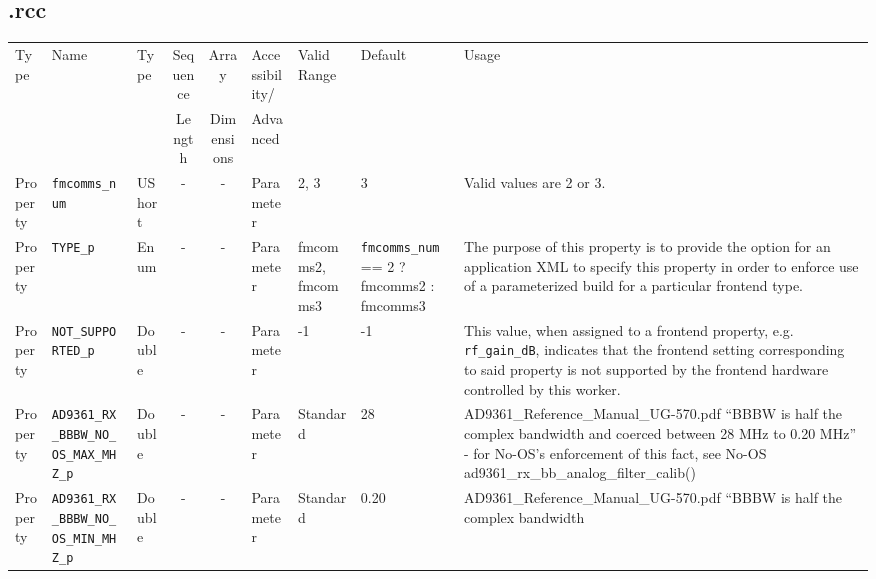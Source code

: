 \begin{landscape}
	\subsection*{\comp.rcc}
	\begin{scriptsize}
		\begin{longtable}{|p{1.8cm}|p{4.1cm}|p{1cm}|c|c|p{1.6cm}|p{3.7cm}|p{3.7cm}|p{2.5cm}|}
			\hline
			\rowcolor{blue}
			Type         & Name                                & Type & Sequence & Array      & Accessibility/ & Valid Range  & Default & Usage                                                                                                                                                                                                                       \\
			\rowcolor{blue}
			             &                                     &      & Length   & Dimensions & Advanced       &              &         &                                                                                                                                                                                                                             \\
			\hline
			Property     & \verb+fmcomms_num+                   & UShort &-        & -          & Parameter & 2, 3 & 3 & Valid values are 2 or 3.\\
			\hline
			Property     & \verb+TYPE_p+                   & Enum &-        & -          & Parameter & fmcomms2, fmcomms3 & \verb+fmcomms_num+ == 2 ? fmcomms2 : fmcomms3 & The purpose of this property is to provide the option for     an application XML to specify this property in order to enforce use of a parameterized build for a     particular frontend type.\\
			\hline
			Property     & \verb+NOT_SUPPORTED_p+                   & Double&-        & -          & Parameter & -1 & -1 & This value, when assigned to a frontend property, e.g. \verb+rf_gain_dB+, indicates that the frontend setting corresponding to said property is not supported by the frontend hardware controlled by this worker.
			 \\
			\hline
			Property     & \verb+AD9361_RX_BBBW_NO_OS_MAX_MHZ_p+ & Double & -       & -          & Parameter & Standard & 28 & AD9361\_Reference\_Manual\_UG-570.pdf ``BBBW is half the complex bandwidth
        and coerced between 28 MHz to 0.20 MHz'' - for No-OS's enforcement of
        this fact, see No-OS ad9361\_rx\_bb\_analog\_filter\_calib()  \\
			\hline
			Property     & \verb+AD9361_RX_BBBW_NO_OS_MIN_MHZ_p+ & Double & -       & -          & Parameter & Standard & 0.20 & AD9361\_Reference\_Manual\_UG-570.pdf ``BBBW is half the complex bandwidth

\end{longtable}
\end{scriptsize}
\end{landscape}
